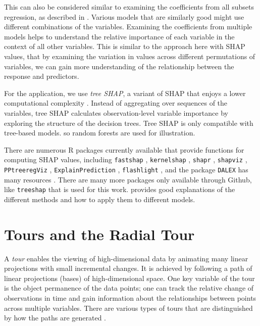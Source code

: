 \documentclass[
]{jss}
\begin{document}
This can also be considered similar to examining the coefficients from
all subsets regression, as described in
\citet{wickham_visualizing_2015}. Various models that are similarly good
might use different combinations of the variables. Examining the
coefficients from multiple models helps to understand the relative
importance of each variable in the context of all other variables. This
is similar to the approach here with SHAP values, that by examining the
variation in values across different permutations of variables, we can
gain more understanding of the relationship between the response and
predictors.

For the application, we use \emph{tree SHAP}, a variant of SHAP that
enjoys a lower computational complexity
\citep{lundberg_consistent_2018}. Instead of aggregating over sequences
of the variables, tree SHAP calculates observation-level variable
importance by exploring the structure of the decision trees. Tree SHAP
is only compatible with tree-based models. so random forests are used
for illustration.

There are numerous R packages currently available that provide functions
for computing SHAP values, including \texttt{fastshap} \citep{fastshap},
\texttt{kernelshap} \citep{kernelshap}, \texttt{shapr} \citep{shapr},
\texttt{shapviz} \citep{shapviz}, \texttt{PPtreeregViz}
\citep{PPtreeregViz}, \texttt{ExplainPrediction}
\citep{ExplainPrediction}, \texttt{flashlight} \citep{flashlight}, and
the package \texttt{DALEX} has many resources \citep{biecek_dalex_2018}.
There are many more packages only available through Github, like
\texttt{treeshap} \citep{kominsarczyk_treeshap_2021} that is used for
this work. \citet{molnar2022} provides good explanations of the
different methods and how to apply them to different models.

\hypertarget{sec:tour}{%
\section{Tours and the Radial Tour}\label{sec:tour}}

A \emph{tour} enables the viewing of high-dimensional data by animating
many linear projections with small incremental changes. It is achieved
by following a path of linear projections (bases) of high-dimensional
space. One key variable of the tour is the object permanence of the data
points; one can track the relative change of observations in time and
gain information about the relationships between points across multiple
variables. There are various types of tours that are distinguished by
how the paths are generated \citep{lee_state_2021, cook_grand_2008}.
\end{document}
